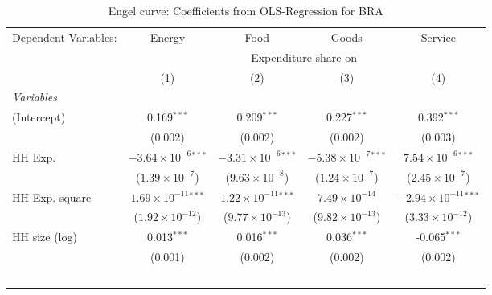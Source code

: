 
\begin{table}[htbp!]
   \centering
   \small
   \begin{adjustbox}{width = 1\textwidth, max height = 0.95\textheight, center}
      \begin{threeparttable}[b]
         \caption{\label{tab:Engel_parametric_BRA} Engel curve: Coefficients from OLS-Regression for BRA}
         \begin{tabular}{lcccc}
            \tabularnewline \midrule \midrule
            Dependent Variables: & Energy                         & Food                           & Goods                          & Service\\  
             & \multicolumn{4}{c}{Expenditure share on} \\ 
                                 & (1)                            & (2)                            & (3)                            & (4)\\  
            \midrule
            \emph{Variables}\\
            (Intercept)          & 0.169$^{***}$                  & 0.209$^{***}$                  & 0.227$^{***}$                  & 0.392$^{***}$\\   
                                 & (0.002)                        & (0.002)                        & (0.002)                        & (0.003)\\   
            HH Exp.              & $-3.64\times 10^{-6}$$^{***}$  & $-3.31\times 10^{-6}$$^{***}$  & $-5.38\times 10^{-7}$$^{***}$  & $7.54\times 10^{-6}$$^{***}$\\    
                                 & ($1.39\times 10^{-7}$)         & ($9.63\times 10^{-8}$)         & ($1.24\times 10^{-7}$)         & ($2.45\times 10^{-7}$)\\    
            HH Exp. square       & $1.69\times 10^{-11}$$^{***}$  & $1.22\times 10^{-11}$$^{***}$  & $7.49\times 10^{-14}$          & $-2.94\times 10^{-11}$$^{***}$\\    
                                 & ($1.92\times 10^{-12}$)        & ($9.77\times 10^{-13}$)        & ($9.82\times 10^{-13}$)        & ($3.33\times 10^{-12}$)\\    
            HH size (log)        & 0.013$^{***}$                  & 0.016$^{***}$                  & 0.036$^{***}$                  & -0.065$^{***}$\\   
                                 & (0.001)                        & (0.002)                        & (0.002)                        & (0.002)\\   
$$
\end{tabular}
\end{threeparttable}
\end{adjustbox}
\end{table}
